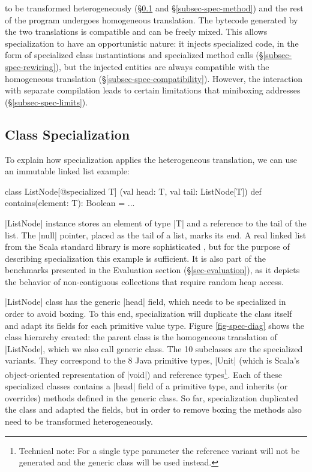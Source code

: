  to be transformed heterogeneously (\S\ref{subsec-spec-class} and \S\ref{subsec-spec-method}) and the rest of the program undergoes homogeneous translation. The bytecode generated by the two translations is compatible and can be freely mixed. This allows specialization to have an opportunistic nature: it injects specialized code, in the form of specialized class instantiations and specialized method calls (\S\ref{subsec-spec-rewiring}), but the injected entities are always compatible with the homogeneous translation (\S\ref{subsec-spec-compatibility}). However, the interaction with separate compilation leads to certain limitations that miniboxing addresses (\S\ref{subsec-spec-limits}).

\subsection{Class Specialization}
\label{subsec-spec-class}

To explain how specialization applies the heterogeneous translation, we can use an immutable linked list example:

\begin{lstlisting-nobreak}
 class ListNode[@specialized T]
          (val head: T, val tail: ListNode[T]) {
   def contains(element: T): Boolean = ...
 }
\end{lstlisting-nobreak}

 |ListNode| instance stores an element of type |T| and a reference to the tail of the list. The |null| pointer, placed as the tail of a list, marks its end. A real linked list from the Scala standard library is more sophisticated \cite{collections-alex, adriaan}, but for the purpose of describing specialization this example is sufficient. It is also part of the benchmarks presented in the Evaluation section (\S\ref{sec-evaluation}), as it depicts the behavior of non-contiguous collections that require random heap access.

 |ListNode| class has the generic |head| field, which needs to be specialized in order to avoid boxing. To this end, specialization will duplicate the class itself and adapt its fields for each primitive value type. Figure \ref{fig-spec-diag} shows the class hierarchy created: the parent class is the homogeneous translation of |ListNode|, which we also call generic class. The 10 subclasses are the specialized variants. They correspond to the 8 Java primitive types, |Unit| (which is Scala's object-oriented representation of |void|) and reference types\footnote{Technical note: For a single type parameter the reference variant will not be generated and the generic class will be used instead.}. Each of these specialized classes contains a |head| field of a primitive type, and inherits (or overrides) methods defined in the generic class. So far, specialization duplicated the class and adapted the fields, but in order to remove boxing the methods also need to be transformed heterogeneously.

